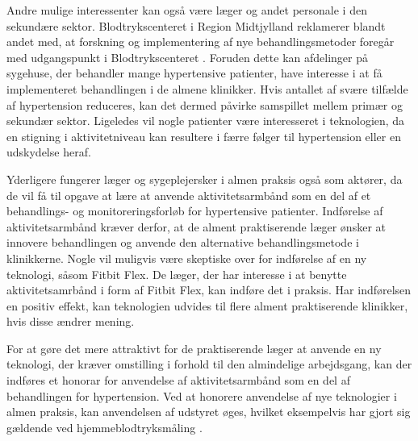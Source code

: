 Andre mulige interessenter kan også være læger og andet personale i den sekundære sektor. Blodtrykscenteret i Region Midtjylland reklamerer blandt andet med, at forskning og implementering af nye behandlingsmetoder foregår med udgangspunkt i Blodtrykscenteret \citep{aarhusuniversitetshospital}. Foruden dette kan afdelinger på sygehuse, der behandler mange hypertensive patienter, have interesse i at få implementeret behandlingen i de almene klinikker. Hvis antallet af svære tilfælde af hypertension reduceres, kan det dermed påvirke samspillet mellem primær og sekundær sektor. Ligeledes vil nogle patienter være interesseret i teknologien, da en stigning i aktivitetniveau kan resultere i færre følger til hypertension eller en udskydelse heraf. 

Yderligere fungerer læger og sygeplejersker i almen praksis også som aktører, da de vil få til opgave at lære at anvende aktivitetsarmbånd som en del af et behandlings- og monitoreringsforløb for hypertensive patienter. 
Indførelse af aktivitetsarmbånd kræver derfor, at de alment praktiserende læger ønsker at innovere behandlingen og anvende den alternative behandlingsmetode i klinikkerne. Nogle vil muligvis være skeptiske over for indførelse af en ny teknologi, såsom Fitbit Flex. De læger, der har interesse i at benytte aktivitetsamrbånd i form af Fitbit Flex, kan indføre det i praksis. Har indførelsen en positiv effekt, kan teknologien udvides til flere alment praktiserende klinikker, hvis disse ændrer mening.

For at gøre det mere attraktivt for de praktiserende læger at anvende en ny teknologi, der kræver omstilling i forhold til den almindelige arbejdsgang, kan der indføres et honorar for anvendelse af aktivitetsarmbånd som en del af behandlingen for hypertension. Ved at honorere anvendelse af nye teknologier i almen praksis, kan anvendelsen af udstyret øges, hvilket eksempelvis har gjort sig gældende ved hjemmeblodtryksmåling \citep{bang2006}.